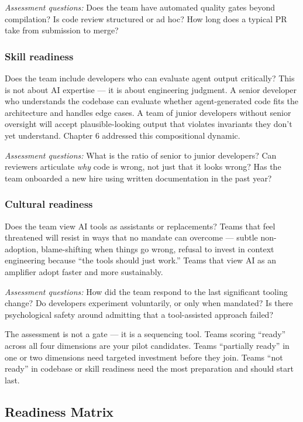 \documentclass[
  a4paper,
  DIV=11,
  numbers=noendperiod]{scrreprt}
\begin{document}
\emph{Assessment questions:} Does the team have automated quality gates
beyond compilation? Is code review structured or ad hoc? How long does a
typical PR take from submission to merge?

\subsubsection{Skill readiness}\label{skill-readiness}

Does the team include developers who can evaluate agent output
critically? This is not about AI expertise --- it is about engineering
judgment. A senior developer who understands the codebase can evaluate
whether agent-generated code fits the architecture and handles edge
cases. A team of junior developers without senior oversight will accept
plausible-looking output that violates invariants they don't yet
understand. Chapter 6 addressed this compositional dynamic.

\emph{Assessment questions:} What is the ratio of senior to junior
developers? Can reviewers articulate \emph{why} code is wrong, not just
that it looks wrong? Has the team onboarded a new hire using written
documentation in the past year?

\subsubsection{Cultural readiness}\label{cultural-readiness}

Does the team view AI tools as assistants or replacements? Teams that
feel threatened will resist in ways that no mandate can overcome ---
subtle non-adoption, blame-shifting when things go wrong, refusal to
invest in context engineering because ``the tools should just work.''
Teams that view AI as an amplifier adopt faster and more sustainably.

\emph{Assessment questions:} How did the team respond to the last
significant tooling change? Do developers experiment voluntarily, or
only when mandated? Is there psychological safety around admitting that
a tool-assisted approach failed?

The assessment is not a gate --- it is a sequencing tool. Teams scoring
``ready'' across all four dimensions are your pilot candidates. Teams
``partially ready'' in one or two dimensions need targeted investment
before they join. Teams ``not ready'' in codebase or skill readiness
need the most preparation and should start last.

\subsection{Readiness Matrix}\label{readiness-matrix}
\end{document}

